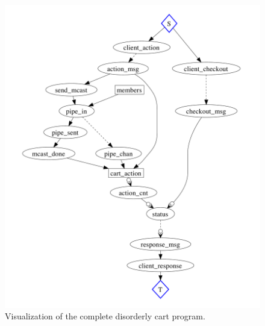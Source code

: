 \begin{figure}[t]
\centering
\includegraphics[width=1\linewidth]{fig/disorderly_complete.pdf}
\vspace{-10pt}
\caption{Visualization of the complete disorderly cart program.}
\label{fig:pdg-disorderly-analysis}
\vspace{-2pt}
\end{figure}


